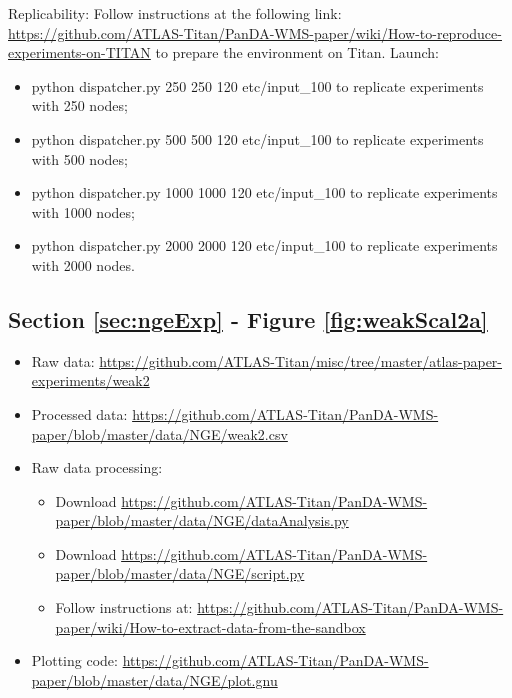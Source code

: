 Replicability: Follow instructions at the following link: \url{https://github.com/ATLAS-Titan/PanDA-WMS-paper/wiki/How-to-reproduce-experiments-on-TITAN} to prepare the environment on Titan.
Launch:
\begin{itemize}
\item python dispatcher.py 250 250 120 etc/input\_100 to replicate experiments with 250 nodes;
\item python dispatcher.py 500 500 120 etc/input\_100 to replicate experiments with 500 nodes;
\item python dispatcher.py 1000 1000 120 etc/input\_100 to replicate experiments with 1000 nodes;
\item python dispatcher.py 2000 2000 120 etc/input\_100 to replicate experiments with 2000 nodes.
\end{itemize}



\subsection{Section \ref{sec:ngeExp} - Figure \ref{fig:weakScal2a}}
\label{apndx:fig10}
\begin{itemize}
    \item Raw data: \url{https://github.com/ATLAS-Titan/misc/tree/master/atlas-paper-experiments/weak2}
     \item Processed data: \url{ https://github.com/ATLAS-Titan/PanDA-WMS-paper/blob/master/data/NGE/weak2.csv} 
    \item Raw data processing: 
    	\begin{itemize}
    		\item Download \url{https://github.com/ATLAS-Titan/PanDA-WMS-paper/blob/master/data/NGE/dataAnalysis.py}
    		\item Download \url{https://github.com/ATLAS-Titan/PanDA-WMS-paper/blob/master/data/NGE/script.py}
    		\item Follow instructions at: \url{https://github.com/ATLAS-Titan/PanDA-WMS-paper/wiki/How-to-extract-data-from-the-sandbox}
   	\end{itemize}
    \item Plotting code: \url{https://github.com/ATLAS-Titan/PanDA-WMS-paper/blob/master/data/NGE/plot.gnu}
\end{itemize}

